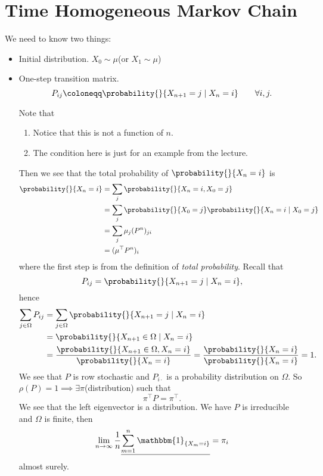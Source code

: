 \section{Time Homogeneous Markov Chain}
We need to know two things:
\begin{itemize}
	\item Initial distribution. \(X_0 \sim \mu\)(or \(X_1\sim \mu\))
	\item One-step transition matrix.
	      \[
		      P_{ij} \coloneqq \probability{}{X_{n+1} = j \mid X_n = i}\qquad \forall i, j.
	      \]


	      \begin{note}
		      Note that
		      \begin{enumerate}
			      \item Notice that this is not a function of \(n\).
			      \item The condition here is just for an example from the lecture.
		      \end{enumerate}
	      \end{note}

	      Then we see that the total probability of \(\probability{}{X_n = i}\) is
	      \[
		      \begin{split}
			      \probability{}{X_n = i} &= \sum_j \probability{}{X_n = i, X_0 = j}\\
			      &= \sum_j \probability{}{X_0 = j}\probability{}{X_n = i  \mid  X_0 = j}\\
			      &=\sum_j \mu_{j} (P^n)_{ji}\\
			      &= (\mu^{\top} P^n)_i
		      \end{split}
	      \]
	      where the first step is from the definition of \emph{total probability}. Recall that
	      \[
		      P_{ij} = \probability{}{X_{n+1} = j \mid X_n = i},
	      \]
	      hence
	      \[
		      \begin{split}
			      \sum_{j\in \Omega} P_{ij} &= \sum_{j\in \Omega} \probability{}{X_{n+1} = j \mid X_n = i}\\
			      &= \probability{}{X_{n+1}\in \Omega \mid X_n = i}\\
			      &= \frac{\probability{}{X_{n+1}\in \Omega, X_n = i} }{\probability{}{X_n = i} }
			      = \frac{\probability{}{X_n = i} }{\probability{}{X_n = i} }
			      = 1.
		      \end{split}
	      \]
	      We see that \(P\) is row stochastic and \(P_{i\cdot}\) is a probability distribution on \(\Omega\). So \(\rho(P) = 1\implies \exists  \pi\)(distribution) such that
	      \[
		      \pi^{\top} P = \pi^{\top}.
	      \]
	      We see that the left eigenvector is a distribution. We have \(P\) is irreducible and \(\Omega\) is finite, then
	      \[
		      \lim_{n\to \infty } \frac{1}{n}\underline{\sum\limits_{m=1}^{n}  \mathbbm{1}_{\left\{ X_m = i \right\} }} = \pi_i
	      \]
	      almost surely.
\end{itemize}

